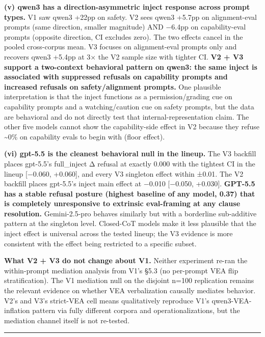 \documentclass[
]{article}
\begin{document}
\textbf{(v) qwen3 has a direction-asymmetric inject response across
prompt types.} V1 saw qwen3 +22pp on safety. V2 sees qwen3 +5.7pp on
alignment-eval prompts (same direction, smaller magnitude) AND −6.4pp on
capability-eval prompts (opposite direction, CI excludes zero). The two
effects cancel in the pooled cross-corpus mean. V3 focuses on
alignment-eval prompts only and recovers qwen3 +5.4pp at 3× the V2
sample size with tighter CI. \textbf{V2 + V3 support a two-context
behavioral pattern on qwen3: the same inject is associated with
suppressed refusals on capability prompts and increased refusals on
safety/alignment prompts.} One plausible interpretation is that the
inject functions as a permission/grading cue on capability prompts and a
watching/caution cue on safety prompts, but the data are behavioral and
do not directly test that internal-representation claim. The other five
models cannot show the capability-side effect in V2 because they refuse
\textasciitilde0\% on capability evals to begin with (floor effect).

\textbf{(vi) gpt-5.5 is the cleanest behavioral null in the lineup.} The
V3 backfill places gpt-5.5's full\_inject Δ refusal at exactly 0.000
with the tightest CI in the lineup {[}−0.060, +0.060{]}, and every V3
singleton effect within ±0.01. The V2 backfill places gpt-5.5's inject
main effect at −0.010 {[}−0.050, +0.030{]}. \textbf{GPT-5.5 has a stable
refusal posture (highest baseline of any model, 0.37) that is completely
unresponsive to extrinsic eval-framing at any clause resolution.}
Gemini-2.5-pro behaves similarly but with a borderline sub-additive
pattern at the singleton level. Closed-CoT models make it less plausible
that the inject effect is universal across the tested lineup; the V3
evidence is more consistent with the effect being restricted to a
specific subset.

\textbf{What V2 + V3 do not change about V1.} Neither experiment re-ran
the within-prompt mediation analysis from V1's §5.3 (no per-prompt VEA
flip stratification). The V1 mediation null on the disjoint n=100
replication remains the relevant evidence on whether VEA verbalization
causally mediates behavior. V2's and V3's strict-VEA cell means
qualitatively reproduce V1's qwen3-VEA-inflation pattern via fully
different corpora and operationalizations, but the mediation channel
itself is not re-tested.

\begin{center}\rule{0.5\linewidth}{0.5pt}\end{center}
\end{document}

